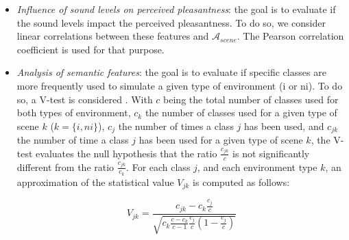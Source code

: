 \documentclass[12pt]{elsarticle}
\begin{document}
\begin{itemize}
\item \emph{Influence of sound levels on perceived pleasantness}: the goal is to evaluate if the sound levels impact the perceived pleasantness. To do so, we consider linear correlations between these features and $\mathcal{A}_{scene}$. The Pearson correlation coefficient is used for that purpose.



\item \emph{Analysis of semantic features}: the goal is to evaluate if specific classes are more frequently used to simulate a given type of environment (i or ni). To do so, a V-test is considered \citep{rakotomalala2008tvpercent}. With $c$ being the total number of classes used for both types of environment, $c_k$ the number of classes used for a given type of scene $k$ ($k=\lbrace i,ni\rbrace$), $c_j$ the number of times a class $j$ has been used, and $c_{jk}$ the number of time a class $j$ has been used for a given type of scene $k$, the V-test evaluates the null hypothesis that the ratio $\frac{c_{jk}}{c}$ is not significantly different from the ratio $\frac{c_{jk}}{c_k}$. For each class $j$, and each environment type $k$, an approximation of the statistical value $V_{jk}$ is computed as follows:

\begin{equation}
V_{jk}=\dfrac{c_{jk}-c_k\frac{c_j}{c}}{\sqrt{c_k\frac{c-c_k}{c-1}\frac{c_j}{c}(1-\frac{c_j}{c})}}
\end{equation}


\end{itemize}
\end{document}
